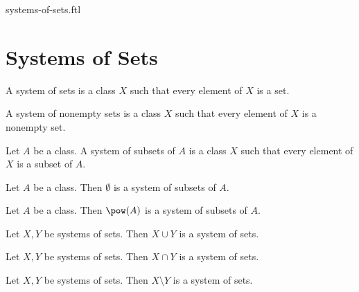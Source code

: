 \documentclass{naproche-library}
\begin{document}
\begin{smodule}{systems-of-sets.ftl}

  \section*{Systems of Sets}

  \begin{definition}[forthel,id=FOUNDATIONS_10_5805323570905088,printid]
    A system of sets is a class $X$ such that every element of $X$ is a set.
  \end{definition}

  \begin{definition}[forthel,id=FOUNDATIONS_10_1631952387964928,printid]
    A system of nonempty sets is a class $X$ such that every element of $X$ is a nonempty set.
  \end{definition}

  \begin{definition}[forthel,id=FOUNDATIONS_10_943381479948288,printid]
    Let $A$ be a class.
    A system of subsets of $A$ is a class $X$ such that every element of $X$ is a subset of $A$.
  \end{definition}

  \begin{proposition}[forthel,id=FOUNDATIONS_10_8268633648136192,printid]
    Let $A$ be a class.
    Then $\emptyset$ is a system of subsets of $A$.
  \end{proposition}

  \begin{proposition}[forthel,id=FOUNDATIONS_10_7546016869908480,printid]
    Let $A$ be a class.
    Then $\pow(A)$ is a system of subsets of $A$.
  \end{proposition}

  \begin{proposition}
    Let $X, Y$ be systems of sets.
    Then $X \cup Y$ is a system of sets.
  \end{proposition}

  \begin{proposition}
    Let $X, Y$ be systems of sets.
    Then $X \cap Y$ is a system of sets.
  \end{proposition}

  \begin{proposition}
    Let $X, Y$ be systems of sets.
    Then $X \setminus Y$ is a system of sets.
  \end{proposition}



\end{smodule}
\end{document}
